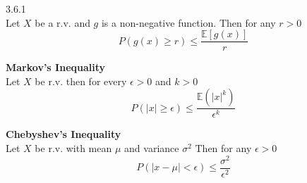 \documentclass[14pt, oneside, letterpaper, fleqn]{notes}
\begin{document}
\begin{theorem}3.6.1 \\
Let $X$ be a r.v. and $g$ is a non-negative function.
Then for any $r>0$
\[P(g(x)\geq r) \leq \frac{\mathbb{E}[g(x)]}{r} \]
\end{theorem}

\begin{mydef} \textbf{Markov's Inequality} \\
Let $X$ be r.v. then for every $\epsilon > 0$ and $k>0$
\[
P(|x| \geq \epsilon) \leq \frac
{\mathbb{E}(|x|^k)}{\epsilon ^k}
\]
\end{mydef}

\begin{mydef}\textbf{Chebyshev's Inequality}\\
Let $X$ be r.v. with mean $\mu$ and variance $\sigma^2$
Then for any $\epsilon > 0$
\[ P(|x - \mu| < \epsilon) \leq \frac{\sigma^2}{\epsilon^2} \]
\end{mydef}
\end{document}

